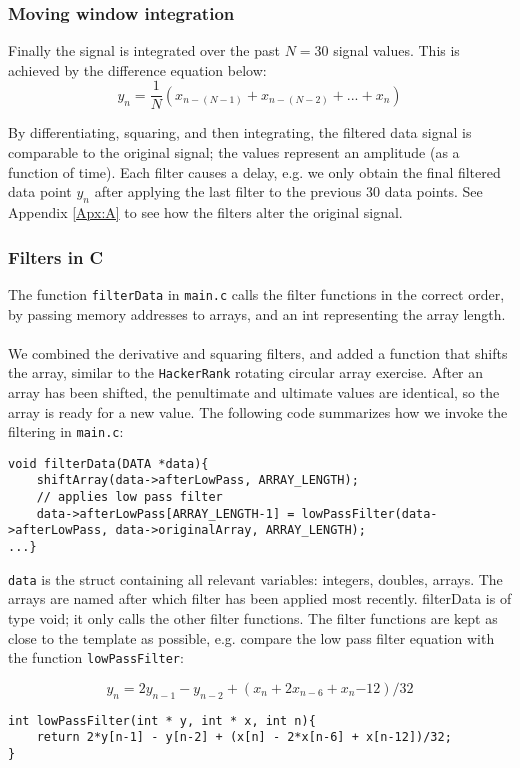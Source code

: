 \subsubsection{Moving window integration}
Finally the signal is integrated over the past $N = 30$ signal values. This is achieved by the difference equation below:
\begin{equation}
    y_n = \frac{1}{N} (x_{n- (N-1)}  + x_{n-(N-2)} + ... +  x_n )
\end{equation}

By differentiating, squaring, and then integrating, the filtered data signal is comparable to the original signal; the values represent an amplitude (as a function of time). Each filter causes a delay, e.g. we only obtain the final filtered data point $y_n$ after applying the last filter to the previous 30 data points. See Appendix \eqref{Apx:A} to see how the filters alter the original signal.

\subsubsection{Filters in C}
The function \texttt{filterData} in \texttt{main.c} calls the filter functions in the correct order, by passing memory addresses to arrays, and an int representing the array length. \\
\\
We combined the derivative and squaring filters, and added a function that shifts the array, similar to the \texttt{HackerRank} rotating circular array exercise. After an array has been shifted, the penultimate and ultimate values are identical, so the array is ready for a new value. The following code summarizes how we invoke the filtering in \texttt{main.c}:

\begin{lstlisting}
void filterData(DATA *data){
    shiftArray(data->afterLowPass, ARRAY_LENGTH);
    // applies low pass filter
    data->afterLowPass[ARRAY_LENGTH-1] = lowPassFilter(data->afterLowPass, data->originalArray, ARRAY_LENGTH);
...}
\end{lstlisting}

\texttt{data} is the struct containing all relevant variables: integers, doubles, arrays. The arrays are named after which filter has been applied most recently.
filterData is of type void; it only calls the other filter functions. The filter functions are kept as close to the template as possible, e.g. compare the low pass filter equation with the function \texttt{lowPassFilter}:

\begin{equation}
    y_n = 2 y_{n-1} - y_{n-2} + (x_n + 2x_{n-6}+ x_n{-12})/32
\end{equation}

\begin{lstlisting}
int lowPassFilter(int * y, int * x, int n){
    return 2*y[n-1] - y[n-2] + (x[n] - 2*x[n-6] + x[n-12])/32;
}
\end{lstlisting}

